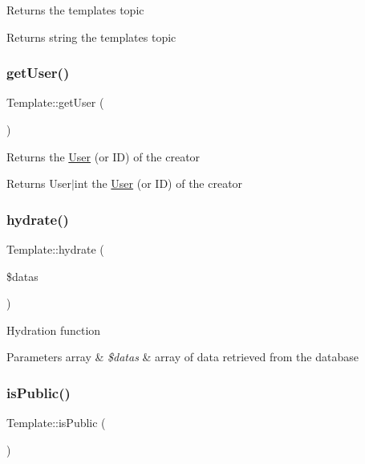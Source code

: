 Returns the template\textquotesingle{}s topic \begin{DoxyReturn}{Returns}
string the template\textquotesingle{}s topic 
\end{DoxyReturn}
\mbox{\label{classTemplate_af79ebfec04b99c7260cb867da880b6d8}} 
\subsubsection{\texorpdfstring{get\+User()}{getUser()}}
{\footnotesize\ttfamily Template\+::get\+User (\begin{DoxyParamCaption}{ }\end{DoxyParamCaption})}

Returns the \hyperlink{classUser}{User} (or ID) of the creator \begin{DoxyReturn}{Returns}
User$\vert$int the \hyperlink{classUser}{User} (or ID) of the creator 
\end{DoxyReturn}
\mbox{\label{classTemplate_a4a65a1fcda5b768c5a1fdae2b4162962}} 
\subsubsection{\texorpdfstring{hydrate()}{hydrate()}}
{\footnotesize\ttfamily Template\+::hydrate (\begin{DoxyParamCaption}\item[{}]{\$datas }\end{DoxyParamCaption})\hspace{0.3cm}{\ttfamily [protected]}}

Hydration function 
\begin{DoxyParams}[1]{Parameters}
array & {\em \$datas} & array of data retrieved from the database \\
\hline
\end{DoxyParams}
\mbox{\label{classTemplate_a593d0d0291badc66fea914fbd9e2a9c9}} 
\subsubsection{\texorpdfstring{is\+Public()}{isPublic()}}
{\footnotesize\ttfamily Template\+::is\+Public (\begin{DoxyParamCaption}{ }\end{DoxyParamCaption})}

